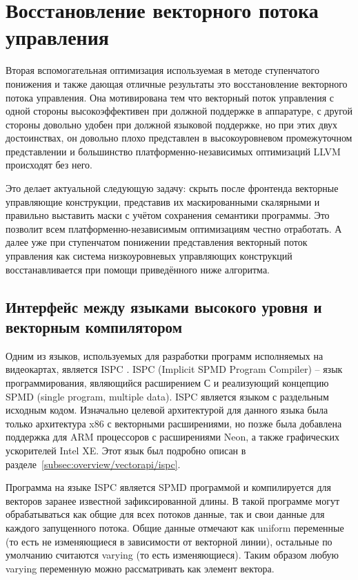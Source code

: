 \section{Восстановление векторного потока управления}\label{sec:lowering/simdcf}

Вторая вспомогательная оптимизация используемая в методе ступенчатого понижения и также дающая отличные результаты это восстановление векторного потока управления. Она мотивирована тем что векторный поток управления с одной стороны высокоэффективен при должной поддержке в аппаратуре, с другой стороны довольно удобен при должной языковой поддержке, но при этих двух достоинствах, он довольно плохо представлен в высокоуровневом промежуточном представлении и большинство платформенно-независимых оптимизаций LLVM происходят без него.

Это делает актуальной следующую задачу: скрыть после фронтенда векторные управляющие конструкции, представив их маскированными скалярными и правильно выставить маски с учётом сохранения семантики программы. Это позволит всем платформенно-независимым оптимизациям честно отработать. А далее уже при ступенчатом понижении представления векторный поток управления как система низкоуровневых управляющих конструкций восстанавливается при помощи приведённого ниже алгоритма.

\subsection{Интерфейс между языками высокого уровня и векторным компилятором}\label{sec:lowering/simdcf/intface}

Одним из языков, используемых для разработки программ исполняемых на видеокартах, является ISPC \cite{pharr2012ispc}. ISPC (Implicit SPMD Program Compiler) -- язык программирования, являющийся расширением С и реализующий концепцию SPMD (single program, multiple data). ISPC является языком с раздельным исходным кодом. Изначально целевой архитектурой для данного языка была только архитектура x86 с векторными расширениями, но позже была добавлена поддержка для ARM процессоров с расширениями Neon, а также графических ускорителей Intel XE. Этот язык был подробно описан в разделе~\cref{subsec:overview/vectorapi/ispc}.

Программа на языке ISPC является SPMD программой и компилируется для векторов заранее известной зафиксированной длины. В такой программе могут обрабатываться как общие для всех потоков данные, так и свои данные для каждого запущенного потока. Общие данные отмечают как uniform переменные (то есть не изменяющиеся в зависимости от векторной линии), остальные по умолчанию считаются varying (то есть изменяющиеся). Таким образом любую varying переменную можно рассматривать как элемент вектора.

